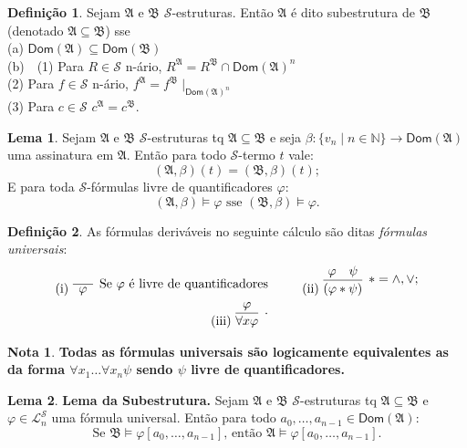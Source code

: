 \documentclass[11pt]{article}
\theoremstyle{definition}
\newtheorem{defn}{Definição}
\newtheorem{note}{Nota}
\newtheorem{lemma}{Lema}
\newcommand{\mc}[1]{\mathcal{#1}}
\newcommand{\mf}[1]{\mathfrak{#1}}
\newcommand{\msf}[1]{\mathsf{#1}}
\newcommand{\mbb}[1]{\mathbb{#1}}
\begin{document}
\begin{shaded}
\begin{defn}
Sejam $\mf{A}$ e $\mf{B}$ $\mc{S}$-estruturas. Então $\mf{A}$ é dito subestrutura de $\mf{B}$ (denotado $\mf{A}\subseteq\mf{B}$) sse\\
(a) $\msf{Dom}(\mf{A})\subseteq\msf{Dom}(\mf{B})$\\
(b)~~(1) Para $R\in\mc{S}$ n-ário, $R^\mf{A}=R^\mf{B}\cap\msf{Dom}(\mf{A})^n$\\
\phantom{aaaa}(2) Para $f\in\mc{S}$ n-ário, $f^\mf{A}=f^\mf{B}\mid_{\msf{Dom}(\mf{A})^n}$\\
\phantom{aaaa}(3) Para $c\in\mc{S}$ $c^\mf{A}=c^\mf{B}$.
\end{defn}
\end{shaded}

\begin{lemma}
Sejam $\mf{A}$ e $\mf{B}$ $\mc{S}$-estruturas tq $\mf{A}\subseteq\mf{B}$ e seja $\beta:\{v_n\mid n\in\mbb{N}\}\to\msf{Dom}(\mf{A})$ uma assinatura em $\mf{A}$. Então para todo $\mc{S}$-termo $t$ vale:
\[
(\mf{A},\beta)(t)=(\mf{B},\beta)(t);
\]
E para toda $\mc{S}$-fórmulas livre de quantificadores $\varphi$:
\[
(\mf{A},\beta)\vDash\varphi\text{ sse }(\mf{B},\beta)\vDash\varphi.
\]
\end{lemma}

\begin{shaded}
\begin{defn}
As fórmulas deriváveis no seguinte cálculo são ditas \textit{fórmulas universais}:
\begin{align*}
    \text{(i) }\infer[\text{Se }\varphi\text{ é livre de quantificadores}]{\varphi}{\phantom{aaa}} & ~~~~~~~~  \text{(ii) } \infer[*=\wedge,\vee;]{(\varphi*\psi)}{\varphi & \psi}\\
    \text{(iii) }\infer[.]{\forall x\varphi}{\varphi}
\end{align*}
\end{defn}
\end{shaded}

\begin{note}
\textbf{Todas as fórmulas universais são logicamente equivalentes as da forma $\forall x_1\dots\forall x_n\psi$ sendo $\psi$ livre de quantificadores.}
\end{note}

\begin{lemma}
\textbf{Lema da Subestrutura.} Sejam $\mf{A}$ e $\mf{B}$ $\mc{S}$-estruturas tq $\mf{A}\subseteq\mf{B}$ e $\varphi\in\mc{L}^\mc{S}_n$ uma fórmula universal. Então para todo $a_0,\dots,a_{n-1}\in\msf{Dom}(\mf{A})$:
\[
\text{Se }\mf{B}\vDash\varphi[a_0,\dots,a_{n-1}]\text{, então }\mf{A}\vDash\varphi[a_0,\dots,a_{n-1}].
\]
\end{lemma}
\end{document}
